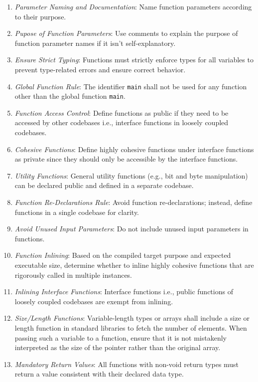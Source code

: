 \documentclass[9pt]{IEEEtran} %
\begin{document}
\begin{enumerate}
  \item \textit{Parameter Naming and Documentation}: Name function parameters according to their purpose. 
  \item \textit{Pupose of Function Parameters}: Use comments to explain the purpose of function parameter names if it isn't self-explanatory.
  \item \textit{Ensure Strict Typing}: Functions must strictly enforce types for all variables to prevent type-related errors and ensure correct behavior.
  \item \textit{Global Function Rule}: The identifier \texttt{main} shall not be used for any function other than the global function \texttt{main}.
  \item \textit{Function Access Control}: Define functions as public if they need to be accessed by other codebases i.e., interface functions in loosely coupled codebases. 
  \item \textit{Cohesive Functions}: Define highly cohesive functions under interface functions as private since they should only be accessible by the interface functions. 
  \item \textit{Utility Functions}: General utility functions (e.g., bit and byte manipulation) can be declared public and defined in a separate codebase.
  \item \textit{Function Re-Declarations Rule}: Avoid function re-declarations; instead, define functions in a single codebase for clarity.
  \item \textit{Avoid Unused Input Parameters}: Do not include unused input parameters in functions.
  \item \textit{Function Inlining}: Based on the compiled target purpose and expected executable size, determine whether to inline highly cohesive functions that are rigorously called in multiple instances. 
  \item \textit{Inlining Interface Functions}: Interface functions i.e., public functions of loosely coupled codebases are exempt from inlining.
  \item \textit{Size/Length Functions}: Variable-length types or arrays shall include a size or length function in standard libraries to fetch the number of elements. When passing such a variable to a function, ensure that it is not mistakenly interpreted as the size of the pointer rather than the original array.
  \item \textit{Mandatory Return Values}: All functions with non-void return types must return a value consistent with their declared data type.

\end{enumerate}
\end{document}

